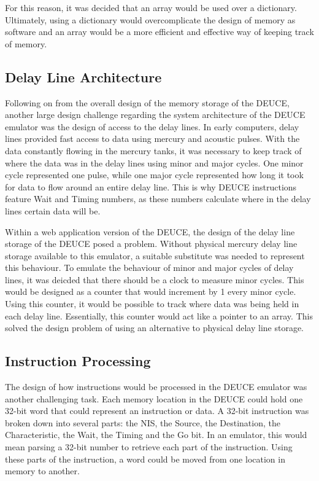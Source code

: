 \documentclass{l4proj}
\begin{document}
For this reason, it was decided that an array would be used over a dictionary. Ultimately, using a dictionary would overcomplicate the design of memory as software and an array would be a more efficient and effective way of keeping track of memory.
\subsection{Delay Line Architecture}
Following on from the overall design of the memory storage of the DEUCE, another large design challenge regarding the system architecture of the DEUCE emulator was the design of access to the delay lines. In early computers, delay lines provided fast access to data using mercury and acoustic pulses. With the data constantly flowing in the mercury tanks, it was necessary to keep track of where the data was in the delay lines using minor and major cycles. One minor cycle represented one pulse, while one major cycle represented how long it took for data to flow around an entire delay line. This is why DEUCE instructions feature Wait and Timing numbers, as these numbers calculate where in the delay lines certain data will be.

Within a web application version of the DEUCE, the design of the delay line storage of the DEUCE posed a problem. Without physical mercury delay line storage available to this emulator, a suitable substitute was needed to represent this behaviour. To emulate the behaviour of minor and major cycles of delay lines, it was deicded that there should be a clock to measure minor cycles. This would be designed as a counter that would increment by 1 every minor cycle. Using this counter, it would be possible to track where data was being held in each delay line. Essentially, this counter would act like a pointer to an array. This solved the design problem of using an alternative to physical delay line storage.

\subsection{Instruction Processing}
The design of how instructions would be processed in the DEUCE emulator was another challenging task. Each memory location in the DEUCE could hold one 32-bit word that could represent an instruction or data. A 32-bit instruction was broken down into several parts: the NIS, the Source, the Destination, the Characteristic, the Wait, the Timing and the Go bit. In an emulator, this would mean parsing a 32-bit number to retrieve each part of the instruction. Using these parts of the instruction, a word could be moved from one location in memory to another. 
\end{document}
